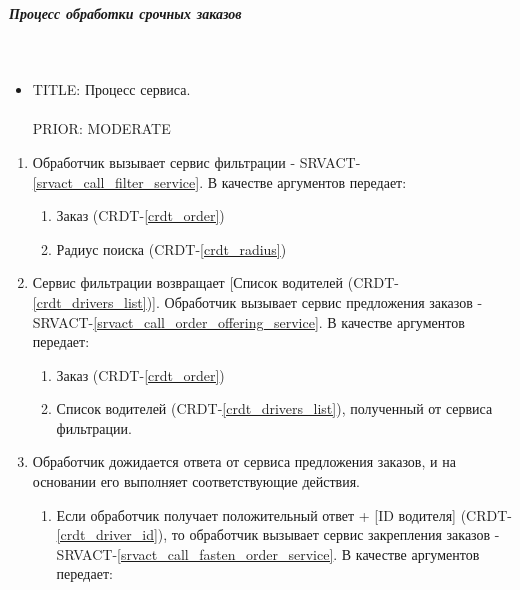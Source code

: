 \subparagraph{Процесс обработки срочных заказов} \mbox{} \\ \label{}

  \begin{itemize}

       \item {
         TITLE: Процесс сервиса.\\
         \\
         PRIOR: MODERATE\\
       }

       \end{itemize}

  \begin{alg} \label{alg_urgent_order_processing} \mbox{}

      \begin{enumerate}

         	\item Обработчик вызывает сервис фильтрации - SRVACT-\ref{srvact_call_filter_service}. В качестве аргументов передает:

         		\begin{enumerate}
         			\item Заказ (CRDT-\ref{crdt_order})
         			\item Радиус поиска (CRDT-\ref{crdt_radius})
         		\end{enumerate}

          \item Сервис фильтрации возвращает [Список водителей (CRDT-\ref{crdt_drivers_list})]. Обработчик вызывает сервис предложения заказов - SRVACT-\ref{srvact_call_order_offering_service}. В качестве аргументов передает:

         		\begin{enumerate}
         			\item Заказ (CRDT-\ref{crdt_order})
         			\item Список водителей (CRDT-\ref{crdt_drivers_list}), полученный от сервиса фильтрации.
         		\end{enumerate}
        
          \item Обработчик дожидается ответа от сервиса предложения заказов, и на основании его выполняет соответствующие действия.
          
          	\begin{enumerate}
         			\item Если обработчик получает положительный ответ + [ID водителя] (CRDT-\ref{crdt_driver_id}), то обработчик вызывает сервис закрепления заказов - SRVACT-\ref{srvact_call_fasten_order_service}. В качестве аргументов передает: 


\end{enumerate}
\end{enumerate}
\end{alg}
